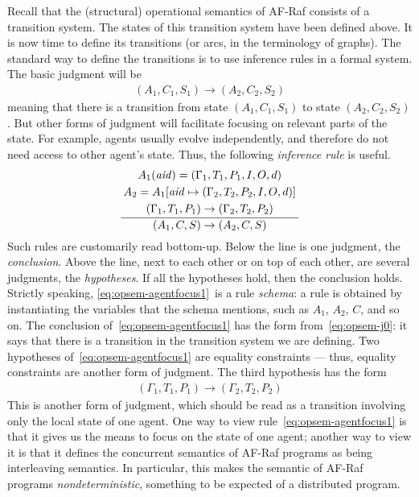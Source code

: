 \documentclass[a4paper,12pt,oneside,fleqn]{book} %
\newcommand{\on}[2]{\genfrac{}{}{0pt}{0}{\strut#1}{\strut#2}}
\begin{document}
{Recall that the (structural) operational semantics of AF-Raf consists of a
transition system. The states of this transition system have been defined
above. It is now time to define its transitions (or arcs, in the
terminology of graphs). The standard way to define the transitions is to
use inference rules in a formal system. The basic judgment will be
\begin{align}
(A_1,C_1,S_1) \to (A_2, C_2,S_2)
\label{eq:opsem-j0}
\end{align}
meaning that there is a transition from state $(A_1,C_1,S_1)$ to state
$(A_2,C_2,S_2)$. But other forms of judgment will facilitate focusing on
relevant parts of the state. For example, agents usually evolve
independently, and therefore do not need access to other agent's state.
Thus, the following \emph{inference rule} is useful.
\begin{align}
\frac
  {\on{A_1({\it aid})=(\Gamma_1,T_1,P_1,I,O,d)}
  {\on{A_2=A_1[{\it aid}\mapsto(\Gamma_2,T_2,P_2,I,O,d)]}
  {(\Gamma_1,T_1,P_1)\to(\Gamma_2,T_2,P_2)}}}
  {(A_1,C,S)\to(A_2,C,S)}
\label{eq:opsem-agentfocus1}
\end{align}
Such rules are customarily read bottom-up. Below the line is one judgment,
the \emph{conclusion}. Above the line, next to each other or on top of each
other, are several judgments, the \emph{hypotheses}. If all the hypotheses
hold, then the conclusion holds. Strictly speaking,
\eqref{eq:opsem-agentfocus1}~is a rule \emph{schema}: a rule is obtained by
instantiating the variables that the schema mentions, such as $A_1$, $A_2$,
$C$, and so on. The conclusion of~\eqref{eq:opsem-agentfocus1} has the form
from~\eqref{eq:opsem-j0}: it says that there is a transition in the
transition system we are defining. Two hypotheses
of~\eqref{eq:opsem-agentfocus1} are equality constraints --- thus, equality
constraints are another form of judgment. The third hypothesis has the form
\begin{align}
(\Gamma_1,T_1,P_1)\to(\Gamma_2,T_2,P_2)
\end{align}
This is another form of judgment, which should be read as a transition
involving only the local state of one agent. One way to view
rule~\eqref{eq:opsem-agentfocus1} is that it gives us the means to focus on
the state of one agent; another way to view it is that it defines the
concurrent semantics of AF-Raf programs as being interleaving semantics. In
particular, this makes the semantic of AF-Raf programs
\emph{nondeterministic}, something to be expected of a distributed program.

}
\end{document}
